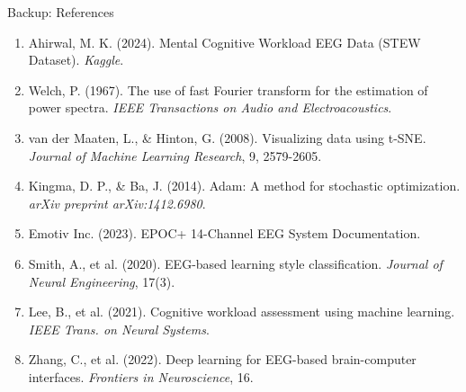 \documentclass[aspectratio=169]{beamer}
\begin{document}
\begin{frame}{Backup: References}
\footnotesize
\begin{enumerate}
    \item Ahirwal, M. K. (2024). Mental Cognitive Workload EEG Data (STEW Dataset). \textit{Kaggle}.
    
    \item Welch, P. (1967). The use of fast Fourier transform for the estimation of power spectra. \textit{IEEE Transactions on Audio and Electroacoustics}.
    
    \item van der Maaten, L., \& Hinton, G. (2008). Visualizing data using t-SNE. \textit{Journal of Machine Learning Research}, 9, 2579-2605.
    
    \item Kingma, D. P., \& Ba, J. (2014). Adam: A method for stochastic optimization. \textit{arXiv preprint arXiv:1412.6980}.
    
    \item Emotiv Inc. (2023). EPOC+ 14-Channel EEG System Documentation.
    
    \item Smith, A., et al. (2020). EEG-based learning style classification. \textit{Journal of Neural Engineering}, 17(3).
    
    \item Lee, B., et al. (2021). Cognitive workload assessment using machine learning. \textit{IEEE Trans. on Neural Systems}.
    
    \item Zhang, C., et al. (2022). Deep learning for EEG-based brain-computer interfaces. \textit{Frontiers in Neuroscience}, 16.
\end{enumerate}
\end{frame}
\end{document}
